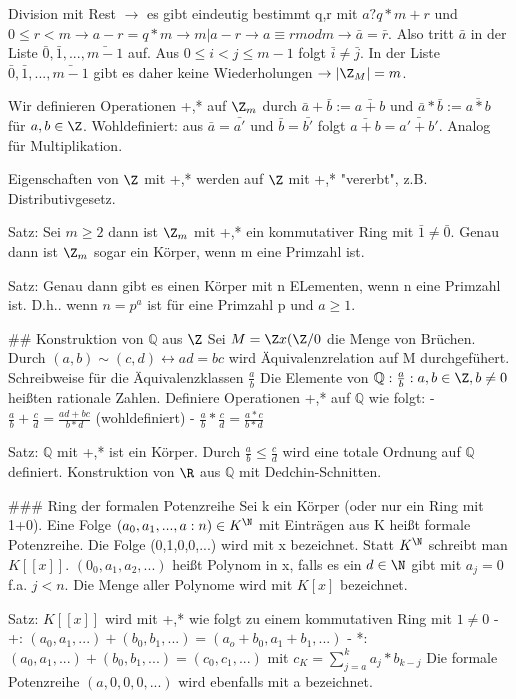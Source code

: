 \documentclass[10pt,landscape]{article}
\begin{document}
\begin{multicols}{3}
{{Division mit Rest $\rightarrow$ es gibt eindeutig bestimmt q,r mit $a?q*m+r$ und $0\leq r < m \rightarrow a-r=q*m \rightarrow m| a-r \rightarrow a\equiv r mod m \rightarrow \bar{a}=\bar{r}$. Also tritt $\bar{a}$ in der Liste $\bar{0},\bar{1},...,\bar{m-1}$ auf. Aus $0\leq i < j \leq m-1$ folgt $\bar{i}\not=\bar{j}$. In der Liste $\bar{0},\bar{1},...,\bar{m-1}$ gibt es daher keine Wiederholungen $\rightarrow |\Z_M|=m$.

Wir definieren Operationen +,* auf $\Z_m$ durch $\bar{a}+\bar{b}:= \bar{a+b}$ und $\bar{a}*\bar{b}:=\bar{a*b}$ für $a,b\in\Z$. 
Wohldefiniert: aus $\bar{a}=\bar{a'}$ und $\bar{b}=\bar{b'}$ folgt $\bar{a+b}=\bar{a'+b'}$. Analog für Multiplikation.

Eigenschaften von $\Z$ mit +,* werden auf $\Z$ mit +,* "vererbt", z.B. Distributivgesetz.

Satz: Sei $m\geq 2$ dann ist $\Z_m$ mit +,* ein kommutativer Ring mit $\bar{1}\not=\bar{0}$. Genau dann ist $\Z_m$ sogar ein Körper, wenn m eine Primzahl ist.

Satz: Genau dann gibt es einen Körper mit n ELementen, wenn n eine Primzahl ist. D.h.. wenn $n=p^a$ ist für eine Primzahl p und $a\geq 1$.

## Konstruktion von $\mathbb{Q}$ aus $\Z$
Sei $M=\Z x(\Z /{0}$ die Menge von Brüchen. Durch $(a,b)\sim (c,d)\leftrightarrow ad=bc$ wird Äquivalenzrelation auf M durchgefühert. Schreibweise für die Äquivalenzklassen $\frac{a}{b}$ Die Elemente von $\mathbb{Q} :{\frac{a}{b}:a,b\in\Z, b\not=0}$ heißten rationale Zahlen.
Definiere Operationen +,* auf $\mathbb{Q}$ wie folgt:
- $\frac{a}{b}+\frac{c}{d} = \frac{ad+bc}{b*d}$ (wohldefiniert)
- $\frac{a}{b}*\frac{c}{d} = \frac{a*c}{b*d}$

Satz: $\mathbb{Q}$ mit +,* ist ein Körper.
Durch $\frac{a}{b}\leq\frac{c}{d}$ wird eine totale Ordnung auf $\mathbb{Q}$ definiert. Konstruktion von $\R$ aus $\mathbb{Q}$ mit Dedchin-Schnitten.

### Ring der formalen Potenzreihe
Sei k ein Körper (oder nur ein Ring mit 1+0). Eine Folge $(a_0, a_1,...,a:n)\in K^{\N}$ mit Einträgen aus K heißt formale Potenzreihe. Die Folge (0,1,0,0,...) wird mit x bezeichnet. Statt $K^{\N}$ schreibt man $K[[x]]$. $(0_0,a_1,a_2,...)$ heißt Polynom in x, falls es ein $d\in\N$ gibt mit $a_j=0$ f.a. $j<n$. Die Menge aller Polynome wird mit $K[x]$ bezeichnet.

Satz: $K[[x]]$ wird mit +,* wie folgt zu einem kommutativen Ring mit $1\not=0$
- +: $(a_0,a_1,...) + (b_0,b_1,...) = (a_o+b_0, a_1+b_1, ...)$
- *: $(a_0,a_1,...) + (b_0,b_1,...) = (c_0, c_1,...)$ mit $c_K=\sum_{j=a}^{k} a_j*b_{k-j}$
Die formale Potenzreihe $(a,0,0,0,...)$ wird ebenfalls mit a bezeichnet.

}}
\end{multicols}
\end{document}
